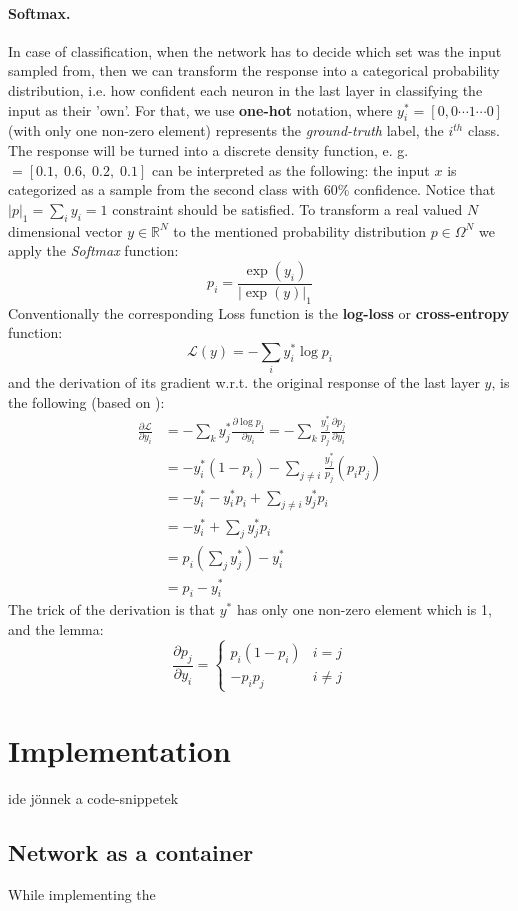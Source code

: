 \paragraph{Softmax.} In case of classification, 
when the network has to decide which set was the input sampled from, 
then we can transform the response into a categorical probability distribution, 
i.e. how confident each neuron in the last layer in classifying the input as their 'own'.
For that, we use \textbf{one-hot} notation, where $y^*_i = \left[ 0,0 \cdots 1 \cdots 0\right]$ (with only one non-zero element) represents the \emph{ground-truth} label, the $i^{th}$ class.
The response will be turned into a discrete density function, e. g. $  = [0.1, \; 0.6, \; 0.2, \; 0.1]$ can be interpreted as the following:
the input $x$ is categorized as a sample from the second class with 60\% confidence. Notice that $|p|_1=\sum_i y_i=1$ constraint should be satisfied.
To transform a real valued $N$ dimensional vector $y \in \mathbb{R}^N$ to the mentioned probability distribution $p\in \Omega^N$ we apply the \emph{Softmax} function:
\begin{equation}
p_i = \frac{\exp(y_i)}{|\exp(y)|_1}
\end{equation}
Conventionally the corresponding Loss function is the \textbf{log-loss} or \textbf{cross-entropy} function:
\begin{equation}
\mathcal{L}(y)=-\sum_i y^*_i \log p_i
\end{equation}
and the derivation of its gradient w.r.t. the original response of the last layer $y$, is the following (based on \cite{softmax}):
\begin{equation}
\begin{split}
\frac{\partial \mathcal{L}}{\partial y_i} &=
-\sum_k y^*_j \frac{\partial \log p_j}{\partial y_i} = 
-\sum_k \frac{y^*_j}{p_j}\frac{\partial p_j}{\partial y_i} \\
&= -y^*_i\left(1-p_i\right) - \sum_{j \neq i} \frac{y^*_j}{p_j}\left(p_i p_j\right) \\
&= -y^*_i-y^*_i p_i + \sum_{j \neq i} y^*_j p_i \\
&= -y^*_i + \sum_j y^*_j p_i \\
&= p_i \left(\sum_j y^*_j\right) -y^*_i \\
&= p_i - y^*_i
\end{split}
\end{equation}
The trick of the derivation is that $y^*$ has only one non-zero element which is 1, and the lemma:
$$
\frac{\partial p_j}{\partial y_i} = 
\begin{cases}
    p_i(1-p_i) & i=j \\
    -p_i p_j & i \neq j
\end{cases}
$$

\section{Implementation}
ide jönnek a code-snippetek 
\subsection{Network as a container}
While implementing the